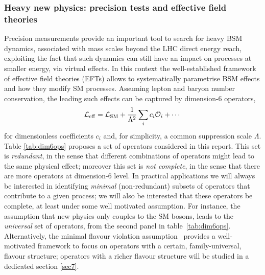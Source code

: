 \subsubsection{Heavy new physics: precision tests and effective field theories}\label{sec:eftintro}
Precision measurements provide an important tool to search for heavy BSM dynamics, associated with mass scales beyond the LHC direct energy reach,  exploiting the fact that such dynamics can still have an impact on processes at smaller energy, via virtual effects.
%
In this context the well-established framework of effective field theories (EFTs) allows to systematically parametrise BSM effects and how they modify SM processes. Assuming lepton and baryon number conservation, the leading such effects can be captured by dimension-6 operators,
\begin{equation}\label{EFTLAG}
\mathcal{L}_{\rm eff} = \mathcal{L}_{\rm SM} + \frac{1}{\Lambda^2} \sum_{i} c_i \mathcal{O}_i+\cdots
\end{equation}
for dimensionless coefficients $c_i$ and, for simplicity, a common suppression scale $\Lambda$. Table \ref{tab:dim6ops} proposes a  set of operators considered in this report. This set is \emph{redundant}, in the sense that different combinations of operators might lead to the same physical effect; moreover this set is \emph{not complete}, in the sense that there are more  operators at dimension-6 level.
In practical applications we will always be interested in identifying \emph{minimal} (non-redundant) subsets of operators that contribute to a given process; we will also be interested that these operators be complete, at least under some well motivated assumption. For instance, the assumption that new physics only couples to the SM bosons, leads to the \emph{universal} set of operators, from the second panel in table~\ref{tab:dim6ops}. Alternatively, the minimal flavour violation assumption~\cite{DAmbrosio:2002vsn} provides a well-motivated framework to focus on operators with a certain, family-universal, flavour structure; operators with a richer flavour structure will be studied in a dedicated section \ref{sec7}.



